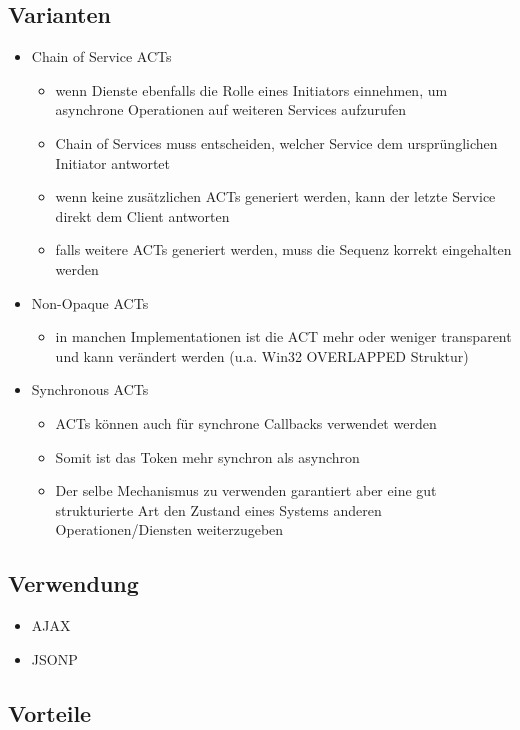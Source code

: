 \subsection*{Varianten}

\begin{itemize}
	\item Chain of Service ACTs
	\begin{itemize}
		\item wenn Dienste ebenfalls die Rolle eines Initiators einnehmen, um asynchrone Operationen auf weiteren Services aufzurufen
		\item Chain of Services muss entscheiden, welcher Service dem ursprünglichen Initiator antwortet
		\item wenn keine zusätzlichen ACTs generiert werden, kann der letzte Service direkt dem Client antworten
		\item falls weitere ACTs generiert werden, muss die Sequenz korrekt eingehalten werden
	\end{itemize}
	\item Non-Opaque ACTs
	\begin{itemize}
		\item in manchen Implementationen ist die ACT mehr oder weniger transparent und kann verändert werden (u.a. Win32 OVERLAPPED Struktur)
	\end{itemize}
	\item Synchronous ACTs
	\begin{itemize}
		\item ACTs können auch für synchrone Callbacks verwendet werden
		\item Somit ist das Token mehr synchron als asynchron
		\item Der selbe Mechanismus zu verwenden garantiert aber eine gut strukturierte Art den Zustand eines Systems anderen Operationen/Diensten weiterzugeben
	\end{itemize}
\end{itemize}


\subsection*{Verwendung}
\begin{itemize}
	\item AJAX
	\item JSONP
\end{itemize}


\subsection*{Vorteile}

